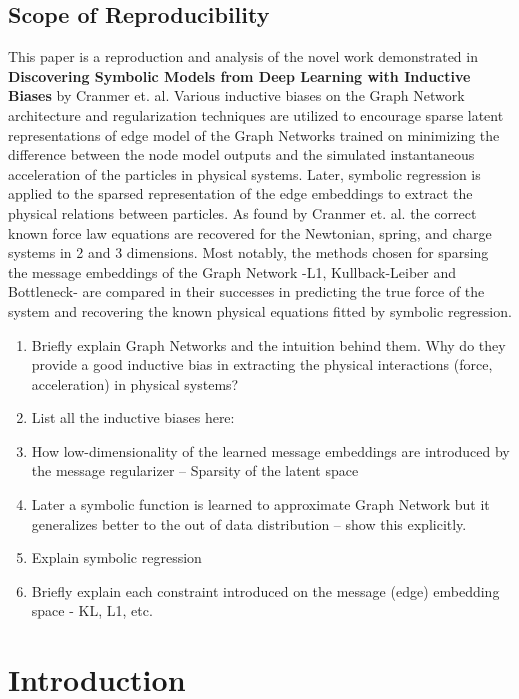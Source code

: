 \documentclass{article}
\begin{document}
\subsection{Scope of Reproducibility}
This paper is a reproduction and analysis of the novel work demonstrated in \textbf{Discovering Symbolic Models from Deep Learning with Inductive Biases} by Cranmer et. al. Various inductive biases on the Graph Network architecture and regularization techniques are utilized to encourage sparse latent representations of edge model of the Graph Networks trained on minimizing the difference between the node model outputs and the simulated instantaneous acceleration of the particles in physical systems. Later, symbolic regression is applied to the sparsed representation of the edge embeddings to extract the physical relations between particles. As found by Cranmer et. al. the correct known force law equations are recovered for the Newtonian, spring, and charge systems in 2 and 3 dimensions. Most notably, the methods chosen for sparsing the message embeddings of the Graph Network -L1, Kullback-Leiber and Bottleneck- are compared in their successes in predicting the true force of the system and recovering the known physical equations fitted by symbolic regression.



\begin{enumerate}
    \item Briefly explain Graph Networks and the intuition behind them. Why do they provide a good inductive bias in extracting the physical interactions (force, acceleration) in physical systems?
    \item List all the inductive biases here:
    \item How low-dimensionality of the learned message embeddings are introduced by the message regularizer  -- Sparsity of the latent space
    \item Later a symbolic function is learned to approximate Graph Network but it generalizes better to the out of data distribution -- show this explicitly.
    \item Explain symbolic regression
    \item Briefly explain each constraint introduced on the message (edge) embedding space - KL, L1, etc.
\end{enumerate}

\section{Introduction}
\end{document}
